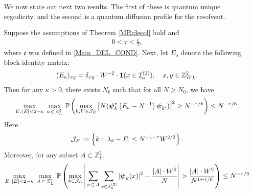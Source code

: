 We now state our next two results. The first of these is {quantum unique ergodicity}, and the second is a quantum diffusion profile for the resolvent. 
\begin{theorem}\label{MR:QUE} 
Suppose the assumptions of Theorem \ref{MR:decol} hold and 
\begin{align}\label{tau} 
0< \tau <  \frac {  \mathfrak c } 2, 
\end{align} 
where $ \mathfrak c$ was defined in \eqref{Main_DEL_COND}. Next, let $E_a$ denote the following  block identity matrix: 
\begin{equation}\label{Def_matE}
(E_a)_{xy}=  \delta_{xy}\cdot W^{-2}\cdot\textbf{1}(x\in {\cal I}^{(2)}_a),\quad x,y\in \mathbb{Z}_{WL}^{2}.
\end{equation}
Then  for any $\kappa>0$,
there exists   $N_0$ such that for all $N \geqslant N_0$, we have
\begin{equation}\label{Meq:QUE}
\max_{E: \,|E|<2-\kappa}\; 
\max_{ a\,\in\, \mathbb Z_L^{2}}\;\mathbb{P}\left(\max_{k,k' \in {\cal J}_E} 
 \left|N (\boldsymbol{\psi}_k^*\left(E_a-N^{-1}\right) \boldsymbol{\psi}_{k'})\right|^2 \ge N^{-\tau/6} \right) \le  N^{-\tau/6}.
\end{equation}
Here 
$${\cal J}_E:=\left\{k: |\lambda_{k}-E|\le N^{-1-\tau} {W^{2/3}}\right\}.
$$
Moreover, for  any  subset $A\subset \mathbb Z_L^{2}$,
\begin{equation}\label{Meq:QUE2}
\max_{E: \,|E|<2-\kappa}\; 
\max_{ A\,\subset\, \mathbb Z_L^{2}}\;\mathbb{P}\left(\max_{k\in {\cal J}_E} 
\left|\,\sum_{a\,\in\, A}\sum_{x\in {\cal I}^{(2)}_a}\left|\boldsymbol{\psi}_k(x)\right |^2 -\frac{|A|\cdot W^{2}}{N}\right| > \frac{|A|\cdot W^{2}}{N^{1+\tau/6}}  \right) \le N^{-\tau/6}
\end{equation}




\end{theorem}

 

